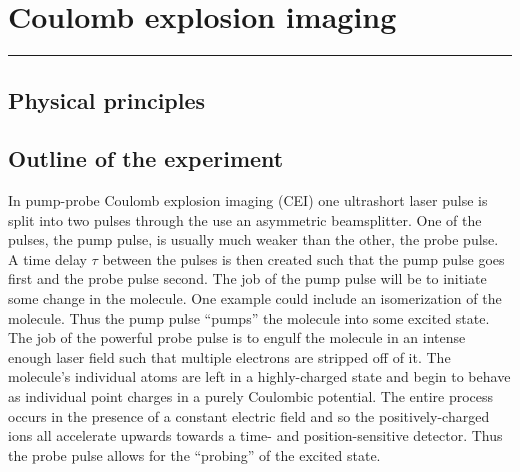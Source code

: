 \chapter{Coulomb explosion imaging}\label{ch:CEI}

\vspace{-1.5 em}
\begin{addmargin}[-0.5cm]{0cm}
  \minitoc
\end{addmargin}
\hrule
\vspace{1.5 em}

\section{Physical principles}\label{sec:CEIphysics}

\section{Outline of the experiment}

In pump-probe Coulomb explosion imaging (CEI) one ultrashort laser pulse is split into two pulses through the use an asymmetric beamsplitter. One of the pulses, the pump pulse, is usually much weaker than the other, the probe pulse. A time delay $\tau$ between the pulses is then created such that the pump pulse goes first and the probe pulse second. The job of the pump pulse will be to initiate some change in the molecule. One example could include an isomerization of the molecule. Thus the pump pulse ``pumps'' the molecule into some excited state. The job of the powerful probe pulse is to engulf the molecule in an intense enough laser field such that multiple electrons are stripped off of it. The molecule's individual atoms are left in a highly-charged state and begin to behave as individual point charges in a purely Coulombic potential. The entire process occurs in the presence of a constant electric field and so the positively-charged ions all accelerate upwards towards a time- and position-sensitive detector. Thus the probe pulse allows for the ``probing'' of the excited state.


